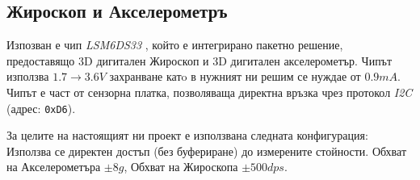 \subsection{Жироскоп и Акселерометръ}

Изпозван е чип \textit{LSM6DS33} \cite{accgyrorefman},
който е интегрирано пакетно решение, 
предоставящо 3D дигитален Жироскоп и 3D дигитален акселерометър.
Чипът използва \(1.7 \to 3.6V\) захранване катo в нужният ни решим се нуждае от \(0.9mA\).
Чипът е част от сензорна платка, позволяваща директна връзка чрез протокол \textit{I2C} (адрес: \texttt{0xD6}).

За целите на настоящият ни проект е използвана следната конфигурация:
Използва се директен достъп (без буфериране) до измерените стойности.
Обхват на Акселерометъра \(\pm 8g\), Обхват на Жироскопа \(\pm 500 dps\).


